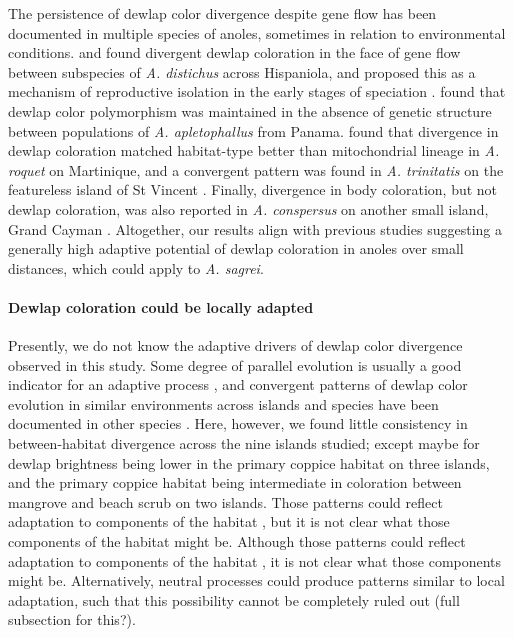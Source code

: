 The persistence of dewlap color divergence despite gene flow has been documented in multiple species of anoles, sometimes in relation to environmental conditions. \citet{Ng2012} and \citet{Ng2016} found divergent dewlap coloration in the face of gene flow between subspecies of \textit{A. distichus} across Hispaniola, and proposed this as a mechanism of reproductive isolation in the early stages of speciation \citep{Ng2011, Lambert2013, Ng2017}. \citet{Stapley2011} found that dewlap color polymorphism was maintained in the absence of genetic structure between populations of \textit{A. apletophallus} from Panama. \citet{Thorpe2002a} found that divergence in dewlap coloration matched habitat-type better than mitochondrial lineage in \textit{A. roquet} on Martinique, and a convergent pattern was found in \textit{A. trinitatis} on the featureless island of St Vincent \citep{Thorpe2002b}. Finally, divergence in body coloration, but not dewlap coloration, was also reported in \textit{A. conspersus} on another small island, Grand Cayman \citep{Macedonia2001}. Altogether, our results align with previous studies suggesting a generally high adaptive potential of dewlap coloration in anoles over small distances, which could apply to \textit{A. sagrei}.


\paragraph{Dewlap coloration could be locally adapted} Presently, we do not know the adaptive drivers of dewlap color divergence observed in this study. Some degree of parallel evolution is usually a good indicator for an adaptive process \citep{Losos2011}, and convergent patterns of dewlap color evolution in similar environments across islands and species have been documented in other species \citep{Thorpe2002a, Thorpe2002b}. Here, however, we found little consistency in between-habitat divergence across the nine islands studied; except maybe for dewlap brightness being lower in the primary coppice habitat on three islands, and the primary coppice habitat being intermediate in coloration between mangrove and beach scrub on two islands. Those patterns could reflect adaptation to components of the habitat \citep{Endler1988}, but it is not clear what those components of the habitat might be. Although those patterns could reflect adaptation to components of the habitat \citep{Endler1988}, it is not clear what those components might be. Alternatively, neutral processes could produce patterns similar to local adaptation, such that this possibility cannot be completely ruled out \citep{Miles2019} (full subsection for this?).\\

